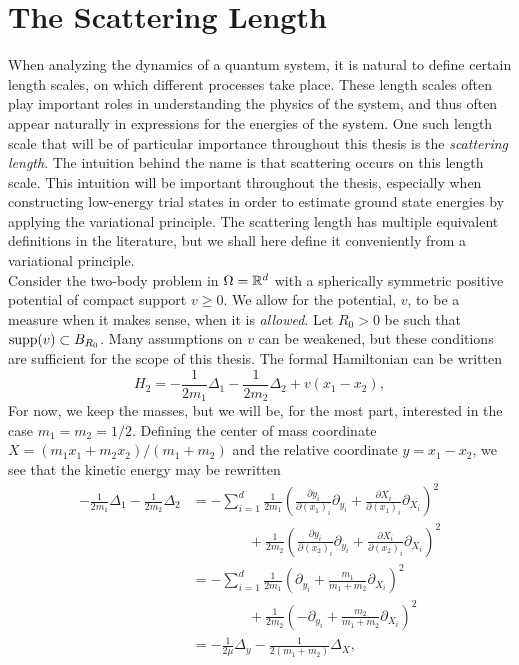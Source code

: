 \section{The Scattering Length}
When analyzing the dynamics of a quantum system, it is natural to define certain length scales, on which different processes take place. These length scales often play important roles in understanding the physics of the system, and thus often appear naturally in expressions for the energies of the system. One such length scale that will be of particular importance throughout this thesis is the \emph{scattering length}. The intuition behind the name is that scattering occurs on this length scale. This intuition will be important throughout the thesis, especially when constructing low-energy trial states in order to estimate ground state energies by applying the variational principle. The scattering length has multiple equivalent definitions in the literature, but we shall here define it conveniently from a variational principle.\\
Consider the two-body problem in $ \Omega=\mathbb{R}^d $ with a spherically symmetric positive potential of compact support $ v\geq 0 $. We allow for the potential, $ v $, to be a measure when it makes sense, \ie when it is \emph{allowed}. Let $ R_0>0 $ be such that $ \text{supp}(v)\subset B_{R_0} $. Many assumptions on $ v $ can be weakened, but these conditions are sufficient for the scope of this thesis. The formal Hamiltonian can be written \begin{equation}
H_2=-\frac{1}{2m_1}\Delta_1-\frac{1}{2m_2}\Delta_2+v(x_1-x_2),
\end{equation}
For now, we keep the masses, but we will be, for the most part, interested in the case $ m_1=m_2=1/2 $. Defining the center of mass coordinate $ X=(m_1x_1+m_2x_2)/(m_1+m_2) $ and the relative coordinate $ y=x_1-x_2 $, we see that the kinetic energy may be rewritten \begin{equation}
\begin{aligned}
-\frac{1}{2m_1}\Delta_1-\frac{1}{2m_2}\Delta_2&=-\sum_{i=1}^{d}\frac{1}{2m_1}\left(\frac{\partial y_i}{\partial (x_1)_i}\partial_{y_i}+\frac{\partial X_i}{\partial (x_1)_i}\partial_{X_i}\right)^2\\&\qquad\qquad+\frac{1}{2m_2}\left(\frac{\partial y_i}{\partial (x_2)_i}\partial_{y_i}+\frac{\partial X_i}{\partial (x_2)_i}\partial_{X_i}\right)^2\\
&=-\sum_{i=1}^{d}\frac{1}{2m_1}\left(\partial_{y_i}+\frac{m_1}{m_1+m_2}\partial_{X_i}\right)^2\\&\qquad\qquad+\frac{1}{2m_2}\left(-\partial_{y_i}+\frac{m_2}{m_1+m_2}\partial_{X_i}\right)^2\\
&=-\frac{1}{2\mu}\Delta_y-\frac{1}{2(m_1+m_2)}\Delta_X,
\end{aligned}
\end{equation}
